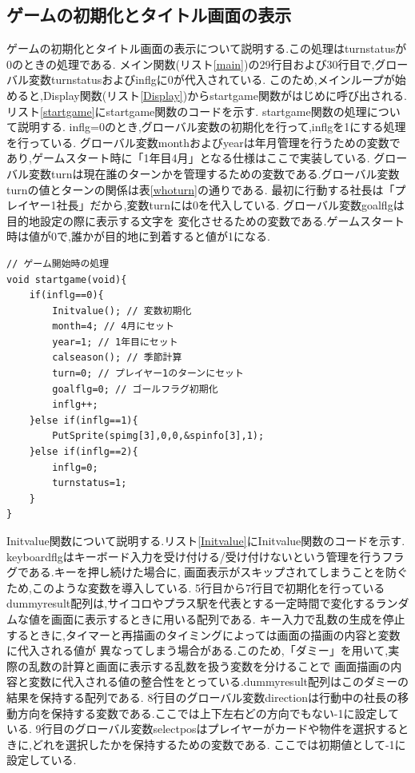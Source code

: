 \documentclass[a4j]{jarticle}
\begin{document}
    \subsection{ゲームの初期化とタイトル画面の表示}
    ゲームの初期化とタイトル画面の表示について説明する.この処理はturnstatusが0のときの処理である.
    メイン関数(リスト\ref{main})の29行目および30行目で,グローバル変数turnstatusおよびinflgに0が代入されている.
    このため,メインループが始めると,Display関数(リスト\ref{Display})からstartgame関数がはじめに呼び出される.\\
    リスト\ref{startgame}にstartgame関数のコードを示す. startgame関数の処理について説明する.
    inflg=0のとき,グローバル変数の初期化を行って,inflgを1にする処理を行っている.
    グローバル変数monthおよびyearは年月管理を行うための変数であり,ゲームスタート時に「1年目4月」となる仕様はここで実装している.
    グローバル変数turnは現在誰のターンかを管理するための変数である.グローバル変数turnの値とターンの関係は表\ref{whoturn}の通りである.
    最初に行動する社長は「プレイヤー1社長」だから,変数turnには0を代入している. グローバル変数goalflgは目的地設定の際に表示する文字を
    変化させるための変数である.ゲームスタート時は値が0で,誰かが目的地に到着すると値が1になる.\\
    \begin{lstlisting}[basicstyle=\ttfamily\footnotesize, frame=single,label=startgame,caption=ゲームスタート時の処理]
// ゲーム開始時の処理
void startgame(void){
    if(inflg==0){
        Initvalue(); // 変数初期化
        month=4; // 4月にセット
        year=1; // 1年目にセット
        calseason(); // 季節計算
        turn=0; // プレイヤー1のターンにセット
        goalflg=0; // ゴールフラグ初期化
        inflg++;
    }else if(inflg==1){
        PutSprite(spimg[3],0,0,&spinfo[3],1);
    }else if(inflg==2){
        inflg=0;
        turnstatus=1;
    }
}
    \end{lstlisting} 

    Initvalue関数について説明する.リスト\ref{Initvalue}にInitvalue関数のコードを示す.
    keyboardflgはキーボード入力を受け付ける/受け付けないという管理を行うフラグである.キーを押し続けた場合に,
    画面表示がスキップされてしまうことを防ぐため,このような変数を導入している. 5行目から7行目で初期化を行っている
    dummyresult配列は,サイコロやプラス駅を代表とする一定時間で変化するランダムな値を画面に表示するときに用いる配列である.
    キー入力で乱数の生成を停止するときに,タイマーと再描画のタイミングによっては画面の描画の内容と変数に代入される値が
    異なってしまう場合がある.このため,「ダミー」を用いて,実際の乱数の計算と画面に表示する乱数を扱う変数を分けることで
    画面描画の内容と変数に代入される値の整合性をとっている.dummyresult配列はこのダミーの結果を保持する配列である.
    8行目のグローバル変数directionは行動中の社長の移動方向を保持する変数である.ここでは上下左右どの方向でもない-1に設定している.
    9行目のグローバル変数selectposはプレイヤーがカードや物件を選択するときに,どれを選択したかを保持するための変数である.
    ここでは初期値として-1に設定している.\\
\end{document}
